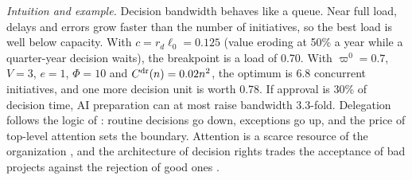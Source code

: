 \noindent\emph{Intuition and example.} Decision bandwidth behaves like a queue. Near full load, delays and errors grow faster than the number of initiatives, so the best load is well below capacity. With $c=r_d\ell_0=0.125$ (value eroding at 50\% a year while a quarter-year decision waits), the breakpoint is a load of 0.70. With $\varpi^0=0.7$, $V=3$, $e=1$, $\Phi=10$ and $C^{\rm dr}(n)=0.02n^2$, the optimum is 6.8 concurrent initiatives, and one more decision unit is worth 0.78. If approval is 30\% of decision time, AI preparation can at most raise bandwidth 3.3-fold. Delegation follows the logic of \citet{garicano2000hierarchies}: routine decisions go down, exceptions go up, and the price of top-level attention sets the boundary. Attention is a scarce resource of the organization \citep{simon1971designing,ocasio1997towards}, and the architecture of decision rights trades the acceptance of bad projects against the rejection of good ones \citep{sah1986architecture}.

